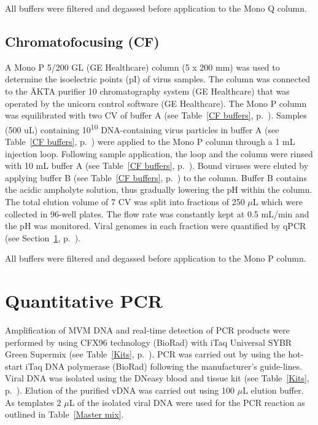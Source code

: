 All buffers were filtered and degassed before application to the Mono Q\textsuperscript{\texttrademark} column.



\subsection{Chromatofocusing (CF)}
\label{CF}

A Mono P\textsuperscript{\texttrademark} 5/200 GL (GE Healthcare) column (5 x 200 mm) was used to determine the isoelectric points (pI) of virus samples.  The column was connected to the ÄKTA purifier 10 chromatography system (GE Healthcare) that was operated by the unicorn control software (GE Healthcare). The Mono P\textsuperscript{\texttrademark} column was equilibrated with two CV of buffer A (see Table~\ref{CF buffers}, p.~\pageref{CF buffers}). Samples (500 uL) containing 10\textsuperscript{10} DNA-containing virus particles in buffer A (see Table~\ref{CF buffers}, p.~\pageref{CF buffers}) were applied to the Mono P\textsuperscript{\texttrademark} column through a 1 mL injection loop. Following sample application, the loop and the column were rinsed with 10 mL buffer A (see Table~\ref{CF buffers}, p.~\pageref{CF buffers}). Bound viruses were eluted by applying buffer B (see Table~\ref{CF buffers}, p.~\pageref{CF buffers}) to the column. Buffer B contains the acidic ampholyte solution, thus gradually lowering the pH within the column. The total elution volume of 7 CV was split into fractions of 250 $\mu$L which were collected in 96-well plates. The flow rate was constantly kept at 0.5 mL/min and the pH was monitored. Viral genomes in each fraction were quantified by qPCR (see Section~\ref{qPCR}, p.~\pageref{qPCR}).      

All buffers were filtered and degassed before application to the Mono P\textsuperscript{\texttrademark} column.


\section{Quantitative PCR}
\label{qPCR}
Amplification of MVM DNA and real-time detection of PCR products were performed by using CFX96 technology (BioRad) with iTaq\textsuperscript{\texttrademark} Universal SYBR\textsuperscript{\textregistered} Green Supermix (see Table~\ref{Kits}, p.~\pageref{Kits}). PCR was carried out by using the hot-start iTaq\textsuperscript{\texttrademark} DNA polymerase (BioRad) following the manufacturer’s guide-lines. Viral DNA was isolated using the DNeasy blood and tissue kit (see Table~\ref{Kits}, p.~\pageref{Kits}). Elution of the purified vDNA was carried out using 100 $\mu$L elution buffer. As templates 2 $\mu$L of the isolated viral DNA were used for the PCR reaction as outlined in Table~\ref{Master mix}.\\

